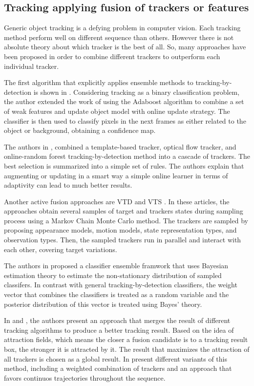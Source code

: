 \subsection{Tracking applying fusion of trackers or features}

Generic object tracking is a defying problem in computer vision. Each tracking method perform well on different sequence than others. However there is not absolute theory about which tracker is the best of all. So, many approaches have been proposed in order to combine different trackers to outperform each individual tracker.

The first algorithm that explicitly applies ensemble methods to tracking-by-detection is shown in \cite{Avidan2007}. Considering tracking as a binary classification problem, the author extended the work of \cite{Collins2005} using the Adaboost algorithm to combine a set of weak features and update object model with online update strategy. The classifier is then used to classify pixels in the next frames as either related to the object or background, obtaining a confidence map. 

The authors in \cite{Santner2010a}, combined a template-based tracker, optical flow tracker, and online-random forest tracking-by-detection method into a cascade of trackers. The best selection is summarized into a simple set of rules. The authors explain that augmenting or updating in a smart way a simple online learner in terms of adaptivity can lead to much better results.

Another active fusion approaches are VTD \cite{Kwon2009} and VTS \cite{Kwon2011a}. In these articles, the approaches obtain several samples of target and trackers states during sampling process using a Markov Chain Monte Carlo method. The trackers are sampled by proposing appearance models, motion models, state representation types, and observation types. Then, the sampled trackers run in parallel and interact with each other, covering target variations.

The authors in \cite{Bai2013} proposed a classifier ensemble framwork that uses Bayesian estimation theory to estimate the non-stationary distribution of sampled classifers. In contrast with general tracking-by-detection classifiers, the weight vector that combines the classifiers is treated as a random variable and the posterior distribution of this vector is treated using Bayes' theory.

In \cite{Bailer2013} and \cite{Bailer2014}, the authors present an approach that merges the result of different tracking algorithms to produce a better tracking result. Based on the idea of attraction fields, which means the closer a fusion candidate is to a tracking result box, the stronger it is attracted by it. The result that maximizes the attraction of all trackers is chosen as a global result. In \cite{Bailer2014} present different variants of this method, including a weighted combination of trackers and an approach that favors continuos trajectories throughout the sequence.